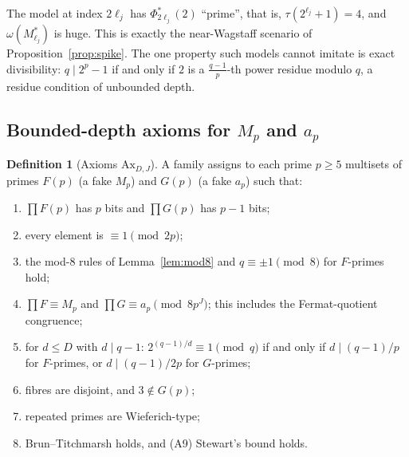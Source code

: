 \documentclass[11pt]{amsart}
\theoremstyle{definition}
\newtheorem{definition}[theorem]{Definition}
\theoremstyle{remark}
\begin{document}
The model at index $2\ell_j$ has $\Phi^*_{2\ell_j}(2)$ ``prime'', that is, $\tau(2^{\ell_j}+1)=4$, and
$\omega(M^*_{\ell_j})$ is huge. This is exactly the near-Wagstaff scenario of Proposition~\ref{prop:spike}. The one
property such models cannot imitate is exact divisibility: $q\mid2^p-1$ if and only if $2$ is a $\frac{q-1}p$-th power
residue modulo $q$, a residue condition of unbounded depth.

\subsection{Bounded-depth axioms for \texorpdfstring{$M_p$}{M\_p} and \texorpdfstring{$a_p$}{a\_p}}

\begin{definition}[Axioms $\mathrm{Ax}_{D,J}$]
A family assigns to each prime $p\ge5$ multisets of primes $F(p)$ (a fake $M_p$) and $G(p)$ (a fake $a_p$) such that:
\begin{enumerate}
\item[(A1)] $\prod F(p)$ has $p$ bits and $\prod G(p)$ has $p-1$ bits;
\item[(A2)] every element is $\equiv1\pmod{2p}$;
\item[(A3)] the mod-$8$ rules of Lemma~\ref{lem:mod8} and $q\equiv\pm1\pmod8$ for $F$-primes hold;
\item[(A4)] $\prod F\equiv M_p$ and $\prod G\equiv a_p\pmod{8p^J}$; this includes the Fermat-quotient congruence;
\item[(A5)] for $d\le D$ with $d\mid q-1$: $2^{(q-1)/d}\equiv1\pmod q$ if and only if $d\mid(q-1)/p$ for $F$-primes, or
$d\mid(q-1)/2p$ for $G$-primes;
\item[(A6)] fibres are disjoint, and $3\notin G(p)$;
\item[(A7)] repeated primes are Wieferich-type;
\item[(A8)] Brun--Titchmarsh holds, and (A9) Stewart's bound holds.
\end{enumerate}
\end{definition}
\end{document}
